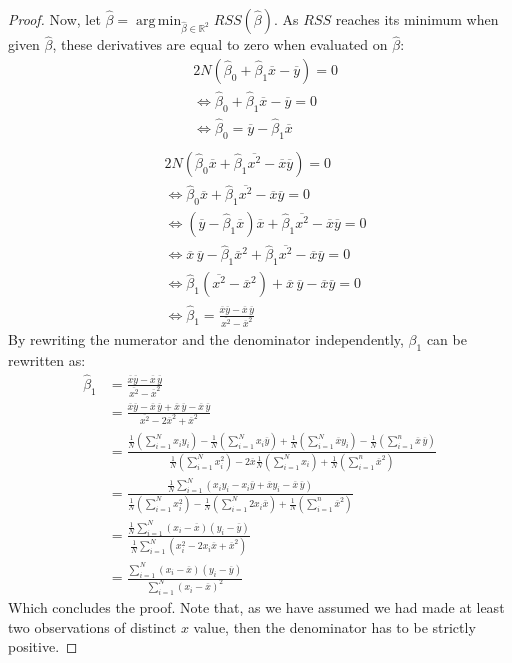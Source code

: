 \documentclass{article}
\theoremstyle{definition}
\theoremstyle{remark}
\theoremstyle{example}
\DeclareMathOperator*{\argmin}{arg\,min}
\newcommand{\betat}{\hat{\beta}}
\newcommand{\mx}{\overline{x}}
\newcommand{\my}{\overline{y}}
\newcommand{\mxy}{\overline{x}\overline{y}}
\newcommand{\mxsquare}{\overline{x^2}}
\begin{document}
\begin{proof}
		Now, let $\betat = \argmin_{\betat \in \mathbb{R}^2} RSS(\betat)$. As $RSS$ reaches its minimum when given $\betat$, these derivatives are equal to zero when evaluated on $\betat$:
		\begin{align*}
				&2N(\betat_0 + \betat_1 \mx - \my) = 0\\
				&\iff \betat_0 + \betat_1 \mx - \my = 0\\
				&\iff \betat_0 = \my - \betat_1 \mx\\
		\end{align*}
		\begin{align*}
				&2N(\betat_0 \mx + \betat_1 \mxsquare - \mxy) = 0\\
				&\iff \betat_0 \mx + \betat_1 \mxsquare - \mxy = 0\\
				&\iff (\my - \betat_1 \mx) \mx + \betat_1 \mxsquare - \mxy = 0\\
				&\iff \mx\,\my - \betat_1 \mx^2 + \betat_1 \mxsquare - \mxy = 0\\
				&\iff \betat_1 (\mxsquare - \mx^2) + \mx\,\my - \mxy = 0\\
				&\iff \betat_1 = \frac{\mxy - \mx\,\my}{\mxsquare - \mx^2}
		\end{align*}
		By rewriting the numerator and the denominator independently, $\beta_1$ can be rewritten as:
		\begin{align*}
				\betat_1 &= \frac{\mxy - \mx\,\my}{\mxsquare - \mx^2}\\
						 &= \frac{\mxy - \mx\,\my + \mx\,\my - \mx\,\my}{\mxsquare - 2\mx^2 + \mx^2}\\
						 &= \frac{\frac{1}{N} (\sum_{i=1}^N x_i y_i) - \frac{1}{N} (\sum_{i=1}^N x_i \my) + \frac{1}{N} (\sum_{i=1}^N \mx y_i) - \frac{1}{N} (\sum_{i=1}^n \mx\,\my)}{\frac{1}{N}(\sum_{i=1}^N x_i^2) - 2\mx\frac{1}{N}(\sum_{i=1}^N x_i) + \frac{1}{N}(\sum_{i=1}^n \mx^2)}\\
						 &= \frac{\frac{1}{N} \sum_{i=1}^N (x_i y_i - x_i \my + \mx y_i - \mx\,\my)}{\frac{1}{N}(\sum_{i=1}^N x_i^2) - \frac{1}{N} (\sum_{i=1}^N 2 x_i \mx) + \frac{1}{N}(\sum_{i=1}^n \mx^2)}\\
						 &= \frac{\frac{1}{N} \sum_{i=1}^N (x_i - \mx)(y_i - \my)}{\frac{1}{N} \sum_{i=1}^N (x_i^2 - 2 x_i \mx + \mx^2)}\\
						 &= \frac{\sum_{i=1}^N (x_i - \mx)(y_i - \my)}{\sum_{i=1}^N (x_i - \mx)^2}
		\end{align*}
		Which concludes the proof. Note that, as we have assumed we had made at least two observations of distinct $x$ value, then the denominator has to be strictly positive.
\end{proof}
\end{document}
